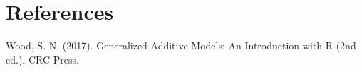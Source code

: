 \section{References}
Wood, S. N. (2017). Generalized Additive Models: An Introduction with R (2nd ed.). CRC Press.